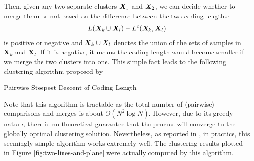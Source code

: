 \documentclass[../../book-main.tex]{subfiles}
\begin{document}
Then, given any two separate clusters $\bm{X}_1$ and $\bm{X}_2$, we can decide whether to merge them or not based on the difference between the two coding lengths:
\begin{equation}
	L(\bm{X}_k \cup \bm{X}_l) - L^c(\bm{X}_k, \bm{X}_l)
\end{equation}
is positive or negative and $\bm{X}_k \cup \bm{X}_l$ denotes the union of the sets of samples in $\bm X_k$ and $\bm X_l$. If it is negative, it means the coding length would become smaller if we merge the two clusters into one. This simple fact leads to the following clustering algorithm proposed by \cite{ma2007segmentation}:
\begin{algorithm}[!htbp]
	\caption{Pairwise Steepest Descent of Coding Length}\label{alg:steepest_descent_coding_length}
	\begin{algorithmic}[1]

		 
		 
		\State{\Return{\(\cC\)}} 
		\Else
		 
		 
		\EndIf
		\EndWhile
		\State{\Return{\(\cC\)}}  
		\EndProcedure
	\end{algorithmic}
\end{algorithm}

Note that this algorithm is tractable as the total number of (pairwise) comparisons and merges is about $O(N^2\log N)$. However, due to its greedy nature, there is no theoretical guarantee that the process will converge to the globally optimal clustering solution. Nevertheless, as reported in \cite{ma2007segmentation}, in practice, this seemingly simple algorithm works extremely well. The clustering results plotted in Figure \ref{fig:two-lines-and-plane} were actually computed by this algorithm.
\end{document}
